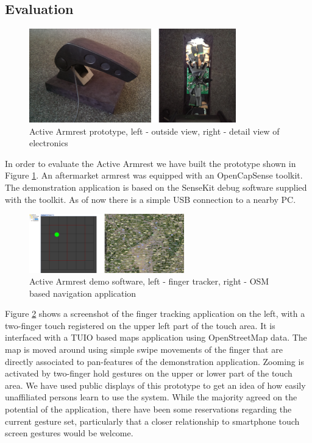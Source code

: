\subsection{Evaluation}
\begin{figure}[h]
\centering
\includegraphics[width=0.8\textwidth]{images/armrest_proto}
\caption{Active Armrest prototype, left - outside view, right - detail view of electronics}
\label{fig:armrest_dataproc}
\end{figure}
In order to evaluate the Active Armrest we have built the prototype shown in Figure \ref{fig:armrest_dataproc}. An aftermarket armrest was equipped with an OpenCapSense toolkit. The demonstration application is based on the SenseKit debug software supplied with the toolkit. As of now there is a simple USB connection to a nearby PC.
\begin{figure}[h]
\centering
\includegraphics[width=0.6\textwidth]{images/armrest_eval}
\caption{Active Armrest demo software, left - finger tracker, right - OSM based navigation application}
\label{fig:armrest_eval}
\end{figure}
Figure \ref{fig:armrest_eval} shows a screenshot of the finger tracking application on the left, with a two-finger touch registered on the upper left part of the touch area. It is interfaced with a TUIO \cite{kaltenbrunner2005tuio} based maps application using OpenStreetMap \cite{haklay2008openstreetmap} data. The map is moved around using simple swipe movements of the finger that are directly associated to pan-features of the demonstration application. Zooming is activated by two-finger hold gestures on the upper or lower part of the touch area. We have used public displays of this prototype to get an idea of how easily unaffiliated persons learn to use the system. While the majority agreed on the potential of the application, there have been some reservations regarding the current gesture set, particularly that a closer relationship to smartphone touch screen gestures would be welcome.
